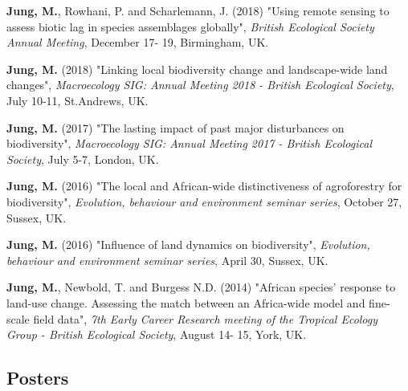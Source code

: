 \documentclass[12pt,a4paper,serif]{moderncv}        %
\begin{document}
\begin{bibenum}

    \item \textbf{Jung, M.}, Rowhani, P. and Scharlemann, J. (2018) "Using remote sensing to assess biotic lag in species assemblages globally", \emph{British Ecological Society Annual Meeting}, December 17- 19, Birmingham, UK. 
    
    \item \textbf{Jung, M.} (2018) "Linking local biodiversity change and landscape-wide land changes", \emph{Macroecology SIG: Annual Meeting 2018 - British Ecological Society}, July 10-11, St.Andrews, UK.

    \item \textbf{Jung, M.} (2017) "The lasting impact of past major disturbances on biodiversity", \emph{Macroecology SIG: Annual Meeting 2017 - British Ecological Society}, July 5-7, London, UK.

    \item \textbf{Jung, M.} (2016) "The local and African-wide distinctiveness of agroforestry for biodiversity", \emph{Evolution, behaviour and environment seminar series}, October 27, Sussex, UK.

    \item \textbf{Jung, M.} (2016) "Influence of land dynamics on biodiversity", \emph{Evolution, behaviour and environment seminar series}, April 30, Sussex, UK.

    \item \textbf{Jung, M.}, Newbold, T. and Burgess N.D. (2014) "African species' response to land-use change. Assessing the match between an Africa-wide model and fine-scale field data", \emph{7th Early Career Research meeting of the Tropical Ecology Group - British Ecological Society}, August 14- 15, York, UK.

\end{bibenum}

\vspace{6pt}
\subsection{Posters}
\end{document}
